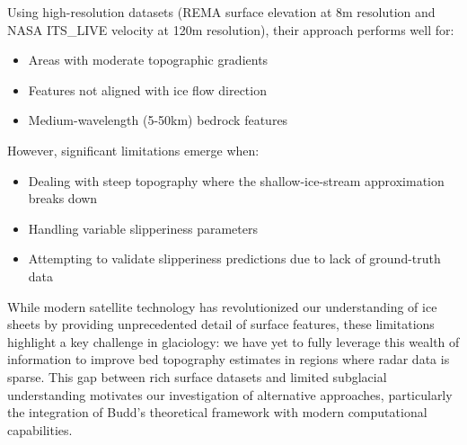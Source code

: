 Using high-resolution datasets (REMA surface elevation at 8m resolution and NASA ITS\_LIVE velocity at 120m resolution), their approach performs well for:
\begin{itemize}
    \item Areas with moderate topographic gradients
    \item Features not aligned with ice flow direction
    \item Medium-wavelength (5-50km) bedrock features
\end{itemize}

However, significant limitations emerge when:
\begin{itemize}
    \item Dealing with steep topography where the shallow-ice-stream approximation breaks down
    \item Handling variable slipperiness parameters
    \item Attempting to validate slipperiness predictions due to lack of ground-truth data
\end{itemize}

While modern satellite technology has revolutionized our understanding of ice sheets by providing unprecedented detail of surface features, these limitations highlight a key challenge in glaciology: we have yet to fully leverage this wealth of information to improve bed topography estimates in regions where radar data is sparse. This gap between rich surface datasets and limited subglacial understanding motivates our investigation of alternative approaches, particularly the integration of Budd's theoretical framework with modern computational capabilities.





